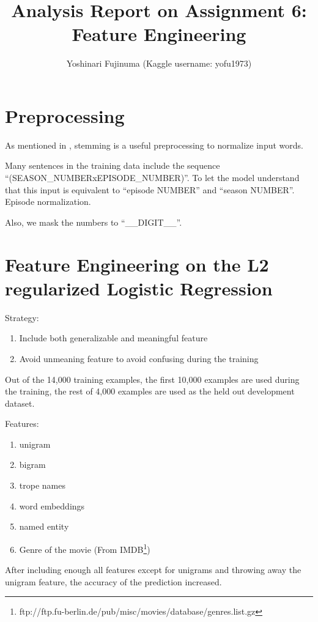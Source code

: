 \documentclass[11pt]{article}
\begin{document}
\title{Analysis Report on Assignment 6: Feature Engineering}
\author{Yoshinari Fujinuma (Kaggle username: yofu1973)}
\date{}
\maketitle

\section{Preprocessing}
As mentioned in \cite{Boyd-Graber:Glasgow:Zajac-2013}, stemming is a useful preprocessing to normalize input words.

Many sentences in the training data include the sequence ``(SEASON\_NUMBERxEPISODE\_NUMBER)''. 
To let the model understand that this input is equivalent to ``episode NUMBER'' and ``season NUMBER''.
Episode normalization.

Also, we mask the numbers to ``\_\_DIGIT\_\_''.

\section{Feature Engineering on the L2 regularized Logistic Regression}

Strategy:
\begin{enumerate}
 \item Include both generalizable and meaningful feature 
 \item Avoid unmeaning feature to avoid confusing during the training
\end{enumerate}


Out of the 14,000 training examples, the first 10,000 examples are used during the training, the rest of 4,000 examples are used as the held out development dataset.

Features:
\begin{enumerate}
 \item unigram
 \item bigram
 \item trope names
 \item word embeddings
 \item named entity 
 \item Genre of the movie (From IMDB\footnote{ftp://ftp.fu-berlin.de/pub/misc/movies/database/genres.list.gz})
\end{enumerate}

After including enough all features except for unigrams and throwing away the unigram feature, the accuracy of the prediction increased.
\end{document}
